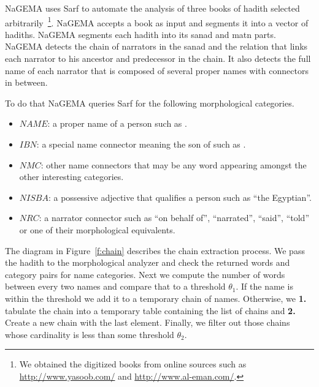 \documentclass[11pt]{article}
\begin{document}
NaGEMA uses Sarf to automate the
analysis of three books of hadith selected 
arbitrarily~\cite{IbnHanbal,AlKulayni,AlTousi}\footnote{We obtained
  the digitized books from online sources such as 
  \href{http://www.yasoob.com/}{http://www.yasoob.com/} and 
  \href{http://www.al-eman.com/}{http://www.al-eman.com/}. }.
NaGEMA accepts a book as input
and segments it into a vector of hadiths. 
NaGEMA segments each hadith into its
sanad and matn parts. 
NaGEMA 
detects the chain of narrators in the sanad and 
the relation that links each narrator to his ancestor and 
predecessor in the chain. 
It also detects the full name of each narrator that is
composed of several proper names with connectors
in between. 

To do that NaGEMA queries Sarf for the following morphological 
categories.
\begin{itemize}
\item $\mathit{NAME}$: a proper name of a person such as  .
\item $\mathit{IBN}$: a special name connector meaning the son of such as .
\item $\mathit{NMC}$: other name connectors that may be any word appearing amongst the other interesting categories. 
\item $\mathit{NISBA}$: a possessive adjective that qualifies a person such 
as  ``the Egyptian''. 
\item $\mathit{NRC}$: a narrator connector such as
 ``on behalf of'',  ``narrated'',  ``said'', 
 ``told'' or one of their morphological equivalents. 
\end{itemize}


The diagram in Figure~\ref{f:chain} describes 
the chain extraction process. 
We pass the hadith to the morphological analyzer 
and check the returned words and category pairs 
for name categories.
Next we compute the number of words between every two names
and compare that to a threshold $\theta_1$.
If the name is within the threshold we add it to a temporary 
chain of names. 
Otherwise, we 
{\bf 1.} tabulate the chain into a temporary table containing 
the list of chains and
{\bf 2.} Create a new chain with the last element.
Finally, we filter out those chains whose cardinality 
is less than some threshold  $\theta_2$.
\end{document}
